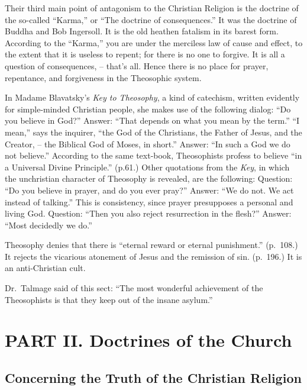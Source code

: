 \documentclass[
]{book}
\begin{document}
Their third main point of antagonism to the Christian Religion is the doctrine of the so-called ``Karma,'' or ``The doctrine of consequences.'' It was the doctrine of Buddha and Bob Ingersoll. It is the old heathen fatalism in its barest form. According to the ``Karma,'' you are under the merciless law of cause and effect, to the extent that it is useless to repent; for there is no one to forgive. It is all a question of consequences, -- that's all. Hence there is no place for prayer, repentance, and forgiveness in the Theosophic system.

In Madame Blavatsky's \emph{Key to Theosophy}, a kind of catechism, written evidently for simple-minded Christian people, she makes use of the following dialog: ``Do you believe in God?'' Answer: ``That depends on what you mean by the term.'' ``I mean,'' says the inquirer, ``the God of the Christians, the Father of Jesus, and the Creator, -- the Biblical God of Moses, in short.'' Answer: ``In such a God we do not believe.'' According to the same text-book, Theosophists profess to believe ``in a Universal Divine Principle.'' (p.61.) Other quotations from the \emph{Key}, in which the unchristian character of Theosophy is revealed, are the following: Question: ``Do you believe in prayer, and do you ever pray?'' Answer: ``We do not. We act instead of talking.'' This is consistency, since prayer presupposes a personal and living God. Question: ``Then you also reject resurrection in the flesh?'' Answer: ``Most decidedly we do.''

Theosophy denies that there is ``eternal reward or eternal punishment.'' (p.~108.) It rejects the vicarious atonement of Jesus and the remission of sin. (p.~196.) It is an anti-Christian cult.

Dr.~Talmage said of this sect: ``The most wonderful achievement of the Theosophists is that they keep out of the insane asylum.''

\hypertarget{part-ii.-doctrines-of-the-church}{%
\chapter*{PART II. Doctrines of the Church}\label{part-ii.-doctrines-of-the-church}}

\hypertarget{concerning-the-truth-of-the-christian-religion}{%
\section*{\texorpdfstring{Concerning the Truth of the Christian Religion}{Concerning the Truth of the Christian Religion}}\label{concerning-the-truth-of-the-christian-religion}}
\end{document}
